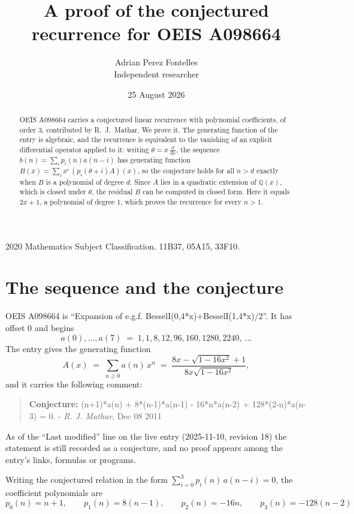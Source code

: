 \documentclass[11pt,a4paper]{article}
\title{A proof of the conjectured recurrence for OEIS A098664}
\author{Adrian Perez Fontelles\\ \small Independent researcher}
\date{25 August 2026}
\theoremstyle{plain}
\theoremstyle{definition}
\begin{document}
\maketitle

\begin{abstract}
OEIS A098664 carries a conjectured linear recurrence with polynomial coefficients, of
order 3, contributed by R.~J.~Mathar. We prove it. The generating function of the
entry is algebraic, and the recurrence is equivalent to the vanishing of an explicit
differential operator applied to it: writing $\theta=x\,\frac{d}{dx}$, the sequence
$b(n)=\sum_{i}p_{i}(n)a(n-i)$ has generating function
$B(x)=\sum_{i}x^{i}\,(p_{i}(\theta+i)A)(x)$, so the conjecture holds for all $n>d$ exactly
when $B$ is a polynomial of degree $d$. Since $A$ lies in a quadratic extension of
$\mathbb{Q}(x)$, which is closed under $\theta$, the residual $B$ can be computed in
closed form. Here it equals $2 x + 1$, a polynomial of degree $1$, which proves
the recurrence for every $n>1$.
\end{abstract}

\noindent\small 2020 Mathematics Subject Classification. 11B37, 05A15, 33F10.\normalsize

\section{The sequence and the conjecture}

OEIS A098664 is ``Expansion of e.g.f. BesselI(0,4*x)+BesselI(1,4*x)/2''. It has offset $0$ and begins
\[
a(0),\dots,a(7)\;=\;1, 1, 8, 12, 96, 160, 1280, 2240,\ \dots
\]
The entry gives the generating function
\begin{equation}\label{eq:gf}
A(x)\;=\;\sum_{n\ge 0} a(n)\,x^{n}\;=\;\frac{8 x - \sqrt{1 - 16 x^{2}} + 1}{8 x \sqrt{1 - 16 x^{2}}} ,
\end{equation}
and it carries the following comment:
\begin{quote}\small
\textbf{Conjecture:} (n+1)*a(n) + 8*(n-1)*a(n-1) - 16*n*a(n-2) + 128*(2-n)*a(n-3) = 0. - \emph{R. J. Mathar}, Dec 08 2011
\end{quote}
As of the ``Last modified'' line on the live entry (2025-11-10, revision 18) the
statement is still recorded as a conjecture, and no proof appears among the entry's links,
formulas or programs.

Writing the conjectured relation in the form $\sum_{i=0}^{3}p_{i}(n)\,a(n-i)=0$,
the coefficient polynomials are
\[
p_{0}(n)=n + 1,\qquad p_{1}(n)=8 \left(n - 1\right),\qquad p_{2}(n)=- 16 n,\qquad p_{3}(n)=- 128 \left(n - 2\right)
\]
\end{document}
